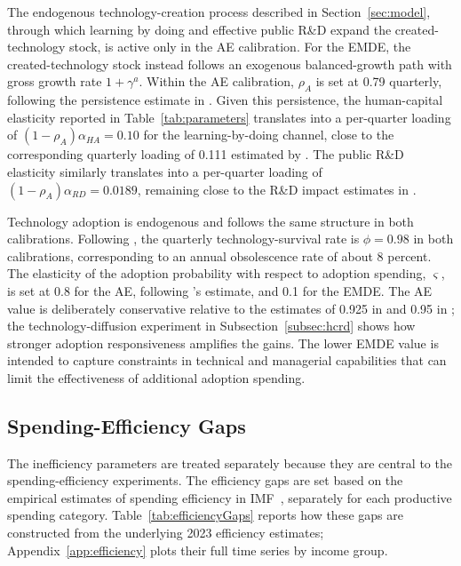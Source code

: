 \documentclass[a4paper,11pt]{article}
\begin{document}
The endogenous technology-creation process described in Section~\ref{sec:model}, through which learning by doing and effective public R\&D expand the created-technology stock, is active only in the AE calibration.
For the EMDE, the created-technology stock instead follows an exogenous balanced-growth path with gross growth rate $1+\gamma^a$.
Within the AE calibration, $\rho_A$ is set at 0.79 quarterly, following the persistence estimate in \citet{ChangGomesSchorfheide2002}.
Given this persistence, the human-capital elasticity reported in Table~\ref{tab:parameters} translates into a per-quarter loading of $(1-\rho_A)\alpha_{HA}=0.10$ for the learning-by-doing channel, close to the corresponding quarterly loading of 0.111 estimated by \citet{ChangGomesSchorfheide2002}.
The public R\&D elasticity similarly translates into a per-quarter loading of $(1-\rho_A)\alpha_{RD}=0.0189$, remaining close to the R\&D impact estimates in \citet{FieldhouseMertens2023}.

Technology adoption is endogenous and follows the same structure in both calibrations.
Following \citet{Anzoateguietal2019}, the quarterly technology-survival rate is $\phi=0.98$ in both calibrations, corresponding to an annual obsolescence rate of about 8 percent.
The elasticity of the adoption probability with respect to adoption spending, $\varsigma$, is set at 0.8 for the AE, following \cite{cloyne2022short}'s estimate, and 0.1 for the EMDE.
The AE value is deliberately conservative relative to the estimates of 0.925 in \citet{Anzoateguietal2019} and 0.95 in \citet{CominGertler2006}; the technology-diffusion experiment in Subsection~\ref{subsec:hcrd} shows how stronger adoption responsiveness amplifies the gains.
The lower EMDE value is intended to capture constraints in technical and managerial capabilities that can limit the effectiveness of additional adoption spending.

\subsection{Spending-Efficiency Gaps}

The inefficiency parameters are treated separately because they are central to the spending-efficiency experiments.
The efficiency gaps are set based on the empirical estimates of spending efficiency in IMF~\citeyearpar[Online Annex 1.2]{IMF2025FM}, separately for each productive spending category.
Table~\ref{tab:efficiencyGaps} reports how these gaps are constructed from the underlying 2023 efficiency estimates; Appendix~\ref{app:efficiency} plots their full time series by income group.
\end{document}
